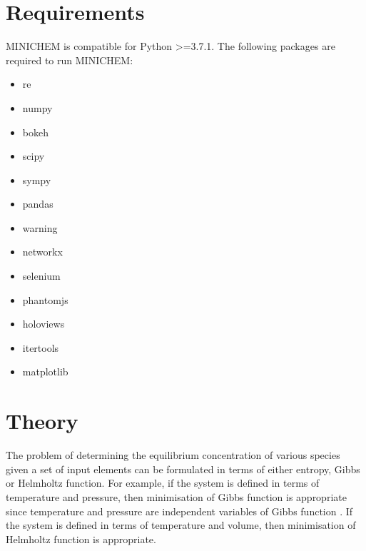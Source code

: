 \documentclass[letterpaper,10pt,english]{sphinxmanual}
\begin{document}
\chapter{Requirements}
\label{\detokenize{Requirements:requirements}}\label{\detokenize{Requirements::doc}}
MINICHEM is compatible for Python \textgreater{}=3.7.1.
The following packages are required to run MINICHEM:
\begin{itemize}
\item {} 
re

\item {} 
numpy

\item {} 
bokeh

\item {} 
scipy

\item {} 
sympy

\item {} 
pandas

\item {} 
warning

\item {} 
networkx

\item {} 
selenium

\item {} 
phantomjs

\item {} 
holoviews

\item {} 
itertools

\item {} 
matplotlib

\end{itemize}


\chapter{Theory}
\label{\detokenize{theory:theory}}\label{\detokenize{theory::doc}}
The problem of determining the equilibrium concentration of various species
given a set of input elements can be formulated in terms of either entropy,
Gibbs or Helmholtz function. For example, if the system is defined in terms of
temperature and pressure, then minimisation of Gibbs function is appropriate
since temperature and pressure are independent variables of Gibbs function
 . If the system is defined in terms of
temperature and volume, then minimisation of Helmholtz function is appropriate.
\end{document}
